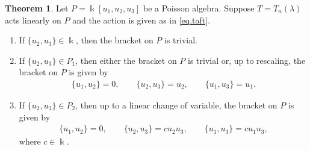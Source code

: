 \documentclass[reqno]{amsart}
\numberwithin{equation}{section}
\theoremstyle{definition}
\newtheorem{theorem}{Theorem}[section]
\newcommand\kk{\Bbbk}
\begin{document}
\begin{theorem}\label{thm.taft}
Let $P=\kk[u_1,u_2,u_3]$ be a Poisson algebra. Suppose $T=T_n(\lambda)$ acts linearly on $P$ and the action is given as in \eqref{eq.taft}.
\begin{enumerate}
    \item If $\{u_2,u_3\} \in \kk$, then the bracket on $P$ is trivial.
    \item If $\{u_2,u_3\} \in P_1$, then either the bracket on $P$ is trivial or, up to rescaling, the bracket on $P$ is given by
\begin{align}\label{eq.taft_linear}
    \{ u_1,u_2\} = 0, \qquad 
    \{u_2,u_3\} = u_2, \qquad 
    \{u_1,u_3\} = u_1.
\end{align}
    \item If $\{u_2,u_3\} \in P_2$, then up to a linear change of variable, the bracket on $P$ is given by
\begin{align}\label{eq.quad_taft}
\{ u_1,u_2\} = 0, \qquad
\{ u_2,u_3\} = cu_2u_3, \qquad
\{ u_1,u_3\} = cu_1u_3,
\end{align}
where $c \in \kk$.
\end{enumerate}
\end{theorem}
\end{document}
